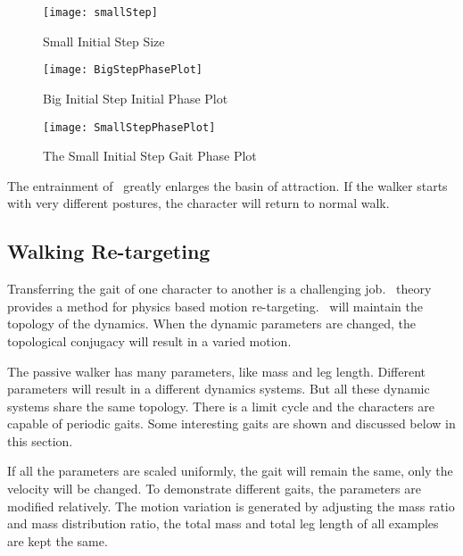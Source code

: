 \begin{figure}[!htbp]
  \begin{center}
      \texttt{[image: smallStep]}
    \caption{Small Initial Step Size}
    \label{fig:smallStepini}
\end{center}
\end{figure}


\begin{figure}[!htbp]
  \begin{center}
      \texttt{[image: BigStepPhasePlot]}
    \caption{Big Initial Step Initial Phase Plot}
    \label{fig:bigstepiniGaitPlot}
\end{center}
\end{figure}


\begin{figure}[!htbp]
  \begin{center}
      \texttt{[image: SmallStepPhasePlot]}
    \caption{The Small Initial Step Gait Phase Plot}
    \label{fig:smallstepiniPhasePlot}
\end{center}
\end{figure}

The entrainment of \cpg\  greatly enlarges the basin of attraction.
If the walker starts with very different postures, the character will return to normal walk.





\subsection{Walking Re-targeting}
Transferring the gait of one character to another is a challenging job.
\moit\ theory provides a method for physics based motion re-targeting.
\cpg\ will maintain the topology of the dynamics.
When the dynamic parameters are changed, the topological conjugacy will result in a varied motion.

The passive walker has many parameters, like mass and leg length.
Different parameters will result in a different dynamics systems.
But all these dynamic systems  share the same topology.
There is a limit cycle and the characters are capable of periodic gaits.
Some interesting gaits are shown and discussed below in this section.

If all the parameters are scaled  uniformly, the gait will remain the same, only the velocity will be changed.
To demonstrate different gaits, the parameters are modified relatively. 
The motion variation is generated by adjusting the mass ratio and mass distribution ratio, the total mass and total leg length of all examples are kept the same.



